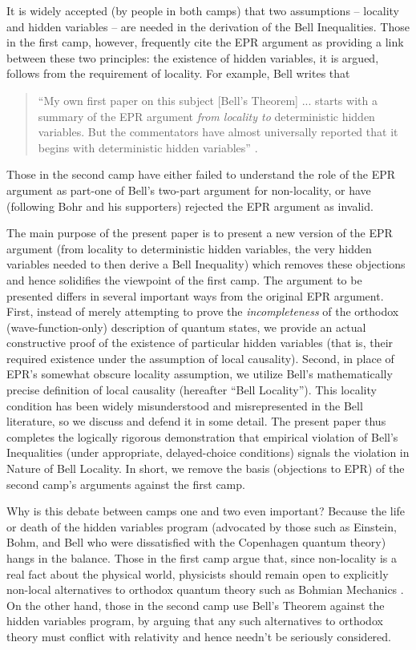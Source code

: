 \documentclass[aps,prc,onecolumn,12pt,nofootinbib]{revtex4-2}
\begin{document}
It is widely accepted (by people in both camps) that two assumptions
-- locality and hidden variables -- are needed in the derivation of
the Bell Inequalities.  Those in the first camp, however, frequently
cite the EPR argument \cite{epr} as providing a link between these two
principles:  the existence of hidden variables, it is argued,
follows from the requirement of locality.  For example, Bell writes that
\begin{quote}
``My own first paper on this subject [Bell's Theorem] ...
starts with a summary of the EPR argument \emph{from locality to}
deterministic hidden variables.  But the commentators have almost
universally reported that it begins with deterministic hidden
variables'' \cite[pg 157]{bell}.
\end{quote}
Those in the second camp have either failed to understand the role of
the EPR argument as part-one of Bell's two-part argument for
non-locality, or have (following Bohr and his supporters) rejected the
EPR argument as invalid.

The main purpose of the present paper is to present a new version of
the EPR argument (from locality to deterministic hidden variables, the
very hidden variables needed to then derive a Bell Inequality) which
removes these objections and hence solidifies the viewpoint of the
first camp.  The
argument to be presented differs in several important ways from
the original EPR argument.  First, instead of merely attempting to
prove the \emph{incompleteness} of the orthodox (wave-function-only)
description of quantum states, we provide an actual constructive proof
of the existence of particular hidden variables (that is, their
required existence under the
assumption of local causality).  Second, in place of EPR's somewhat
obscure locality assumption, we utilize Bell's mathematically precise
definition of local causality (hereafter ``Bell Locality'').  This
locality condition has been widely misunderstood and misrepresented in
the Bell literature, so we discuss and defend it in some detail.  The
present paper thus completes the logically rigorous demonstration that
empirical violation of Bell's Inequalities (under appropriate,
delayed-choice conditions) signals the violation in Nature of Bell
Locality.  In short, we remove the basis (objections to EPR) of the
second camp's arguments against the first camp.

Why is this debate between camps one and two even important?
Because the life or
death of the hidden variables program (advocated by those such as
Einstein, Bohm, and Bell who were dissatisfied with the Copenhagen
quantum theory) hangs in the balance.  Those in the first camp
argue that, since non-locality is a real fact about the
physical world, physicists should remain open to
explicitly non-local alternatives to orthodox quantum theory
such as Bohmian Mechanics  \cite{bohmmech}.
On the other hand, those in the second camp use Bell's Theorem against
the hidden variables program, by arguing that any such alternatives to
orthodox theory must conflict with relativity and hence needn't be
seriously considered.
\end{document}
